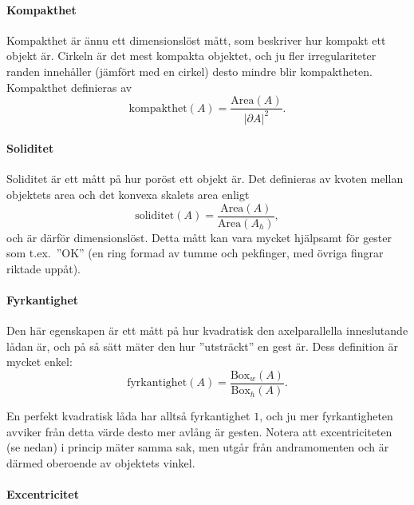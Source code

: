 \documentclass[../rapport_MVEX01-11-05]{subfiles}
\begin{document}
\paragraph{Kompakthet}

Kompakthet \cite[s.~26]{Rudemo09} är ännu ett dimensionslöst mått, som
beskriver hur kompakt ett objekt är.
Cirkeln är det mest kompakta objektet, och ju fler irregulariteter
randen innehåller (jämfört med en cirkel) desto mindre blir kompaktheten.
Kompakthet definieras av
\begin{equation*}
  \textrm{kompakthet}(A) = \frac{\textrm{Area}(A)}{\left|\partial
  A\right|^2}.
\end{equation*}

\paragraph{Soliditet}

Soliditet är ett mått på hur poröst ett objekt är. Det
definieras av kvoten mellan objektets area och det konvexa skalets
area enligt
\begin{equation*}
  \textrm{soliditet}(A) = \frac{\textrm{Area}(A)}{\textrm{Area}(A_h)},
\end{equation*}
och är därför dimensionslöst. Detta mått kan vara mycket hjälpsamt för
gester som t.ex.~''OK'' (en ring formad av tumme och pekfinger, med
övriga fingrar riktade uppåt).

\paragraph{Fyrkantighet}

Den här egenskapen är ett mått på hur kvadratisk den axelparallella
inneslutande lådan är, och på så sätt mäter den hur ''utsträckt'' en
gest är. Dess definition är mycket enkel:
\begin{equation*}
  \textrm{fyrkantighet}(A) = \frac{\textrm{Box}_w(A)}{\textrm{Box}_h(A)}.
\end{equation*}

En perfekt kvadratisk låda har alltså fyrkantighet $1$, och ju mer
fyrkantigheten avviker från detta värde desto mer avlång är gesten.
Notera att excentriciteten (se nedan) i princip mäter samma sak, men utgår från
andramomenten och är därmed oberoende av objektets vinkel.

\paragraph{Excentricitet}
\end{document}
